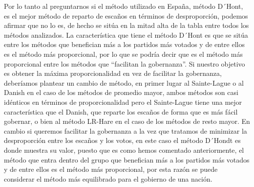 \documentclass[12pt,a4paper,]{book}
\numberwithin{dummy}{section}
\theoremstyle{ocrenumbox}
\theoremstyle{blacknumex}
\theoremstyle{blacknumbox}
\theoremstyle{ocrenum}
\theoremstyle{ocrenum}
\begin{document}
Por lo tanto al preguntarnos si el método utilizado en España, método
D´Hont, es el mejor método de reparto de escaños en términos de
desproporción, podemos afirmar que no lo es, de hecho se sitúa en la
mitad alta de la tabla entre todos los métodos analizados. La
característica que tiene el método D´Hont es que se sitúa entre los
métodos que benefician más a los partidos más votados y de entre ellos
es el método más proporcional, por lo que se podría decir que es el
método más proporcional entre los métodos que ``facilitan la
gobernanza''. Si nuestro objetivo es obtener la máxima proporcionalidad
en vez de facilitar la gobernanza, deberíamos plantear un cambio de
método, en primer lugar al Sainte-Lague o al Danish en el caso de los
métodos de promedio mayor, ambos métodos son casi idénticos en términos
de proporcionalidad pero el Sainte-Lague tiene una mejor característica
que el Danish, que reparte los escaños de forma que es más fácil
gobernar, o bien al método LR-Hare en el caso de los métodos de resto
mayor. En cambio si queremos facilitar la gobernanza a la vez que
tratamos de minimizar la desproporción entre los escaños y los votos, en
este caso el método D´Hondt es donde muestra su valor, puesto que es
como hemos comentado anteriormente, el método que entra dentro del grupo
que benefician más a los partidos más votados y de entre ellos es el
método más proporcional, por esta razón se puede considerar el método
más equilibrado para el gobierno de una nación.




\end{document}
